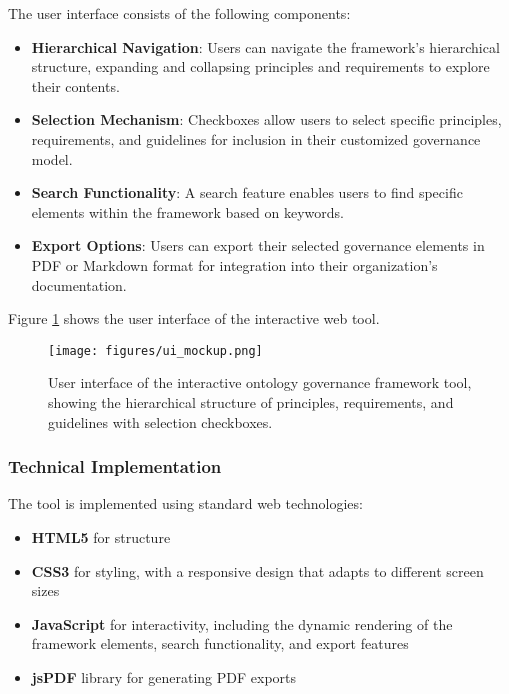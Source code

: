 \documentclass[conference]{IEEEtran}
\begin{document}
The user interface consists of the following components:

\begin{itemize}
    \item \textbf{Hierarchical Navigation}: Users can navigate the framework's hierarchical structure, expanding and collapsing principles and requirements to explore their contents.
    \item \textbf{Selection Mechanism}: Checkboxes allow users to select specific principles, requirements, and guidelines for inclusion in their customized governance model.
    \item \textbf{Search Functionality}: A search feature enables users to find specific elements within the framework based on keywords.
    \item \textbf{Export Options}: Users can export their selected governance elements in PDF or Markdown format for integration into their organization's documentation.
\end{itemize}

Figure \ref{fig:ui} shows the user interface of the interactive web tool.

\begin{figure}[htbp]
\centerline{\texttt{[image: figures/ui\_mockup.png]}}
\caption{User interface of the interactive ontology governance framework tool, showing the hierarchical structure of principles, requirements, and guidelines with selection checkboxes.}
\label{fig:ui}
\end{figure}

\subsubsection{Technical Implementation}

The tool is implemented using standard web technologies:

\begin{itemize}
    \item \textbf{HTML5} for structure
    \item \textbf{CSS3} for styling, with a responsive design that adapts to different screen sizes
    \item \textbf{JavaScript} for interactivity, including the dynamic rendering of the framework elements, search functionality, and export features
    \item \textbf{jsPDF} library for generating PDF exports
\end{itemize}
\end{document}
